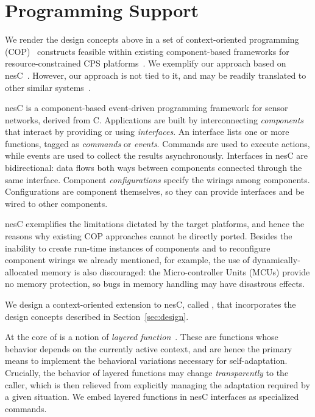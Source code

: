 
\section{Programming Support}
\label{sec:conesc}

We render the design concepts above in a set of context-oriented
programming (COP)~\cite{Hirschfeld08} constructs feasible within
existing component-based frameworks for resource-constrained CPS
platforms~\cite{mottola10:survey}.  We exemplify our approach based on
nesC~\cite{gay03nesc}. However, our approach is not tied to it, and
may be readily translated to other similar
systems~\cite{mottola10:survey}.

 nesC is a component-based event-driven
programming framework for sensor networks, derived from
C. Applications are built by interconnecting \emph{components} that
interact by providing or using \emph{interfaces}. An interface lists
one or more functions, tagged as \emph{commands} or
\emph{events}. Commands are used to execute actions, while events are
used to collect the results asynchronously.  Interfaces in nesC are
bidirectional: data flows both ways between components connected
through the same interface.  Component \emph{configurations} specify
the wirings among components. Configurations are component themselves,
so they can provide interfaces and be wired to other components.

nesC exemplifies the limitations dictated by the target platforms, and
hence the reasons why existing COP approaches cannot be directly
ported. Besides the inability to create run-time instances of
components and to reconfigure component wirings we already mentioned,
for example, the use of dynamically-allocated memory is also
discouraged: the Micro-controller Units (MCUs) provide no memory
protection, so bugs in memory handling may have disastrous effects.

\fakepar{\conesc} We design a
context-oriented extension to nesC, called \conesc, that incorporates
the design concepts described in Section~\ref{sec:design}. 

At the core of \conesc is a notion of \emph{layered
  function}~\cite{Hirschfeld08}. These are functions whose behavior
depends on the currently active context, and are hence the primary
means to implement the behavioral variations necessary for
self-adaptation. Crucially, the behavior of layered functions may
change \emph{transparently} to the caller, which is then relieved from
explicitly managing the adaptation required by a given situation. We
embed layered functions in nesC interfaces as specialized commands.



